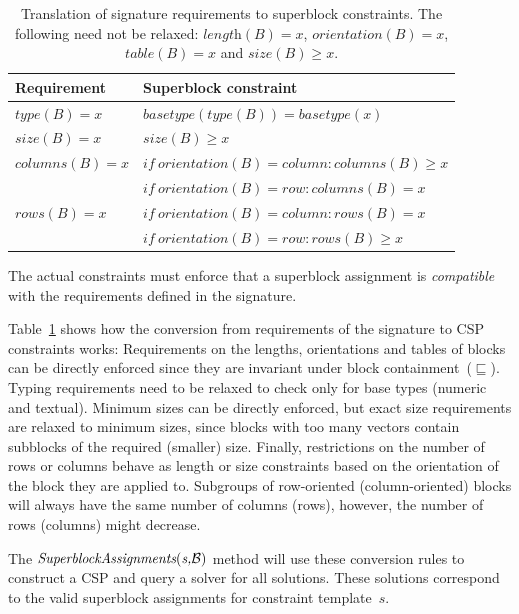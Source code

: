 \documentclass{IEEEtran}
\newcommand{\format}[1]{\textit{#1}\xspace}
\newcommand{\generategroups}{\format{SuperblockAssignments}}
\newcommand{\blocks}{\ensuremath{\mathcal{B}}\xspace}
\newcommand{\plength}{\format{length}}
\newcommand{\psize}{\format{size}}
\newcommand{\ptype}{\format{type}}
\newcommand{\ptable}{\format{table}}
\newcommand{\por}{\format{orientation}}
\newcommand{\prows}{\format{rows}}
\newcommand{\pcols}{\format{columns}}
\theoremstyle{definition}
\begin{document}
\begin{table}[t]
  \caption{Translation of signature requirements to superblock constraints. The following need not be relaxed: $\plength(B) = x$, $\por(B) = x$, $\ptable(B) = x$ and $\psize(B) \geq x$.}
  \label{tbl:translation}
  \begin{tabularx}{\linewidth}{lX}
    \textbf{Requirement} & \textbf{Superblock constraint} \\ \hline \hline
    $\ptype(B) = x$ & $\mathit{basetype}(\ptype(B)) = \mathit{basetype}(x)$ \\ \hline
    $\psize(B) = x$ & $\psize(B) \geq x$ \\ \hline
    $\pcols(B) = x$ & $\mathit{if}~\por(B) = \mathit{column}: \pcols(B) \geq x$ \\ 
    & $\mathit{if}~\por(B) = \mathit{row}: \pcols(B) = x$ \\ \hline
    $\prows(B) = x$ & $\mathit{if}~\por(B) = \mathit{column}: \prows(B) = x$ \\ 
    & $\mathit{if}~\por(B) = \mathit{row}: \prows(B) \geq x$
  \end{tabularx}
\end{table}

The actual constraints must enforce that a superblock assignment is \textit{compatible} with the requirements defined in the signature.

Table~\ref{tbl:translation} shows how the conversion from requirements of the signature to CSP constraints works:
Requirements on the lengths, orientations and tables of blocks can be directly enforced since they are invariant under block containment~($\sqsubseteq$).
Typing requirements need to be relaxed to check only for base types (numeric and textual).
Minimum sizes can be directly enforced, but exact size requirements are relaxed to minimum sizes, since blocks with too many vectors contain subblocks of the required (smaller) size.
Finally, restrictions on the number of rows or columns behave as length or size constraints based on the orientation of the block they are applied to.
Subgroups of row-oriented (column-oriented) blocks will always have the same number of columns (rows), however, the number of rows (columns) might decrease.

The $\generategroups(\textit{s,\blocks})$ method will use these conversion rules to construct a CSP and query a solver for all solutions.
These solutions correspond to the valid superblock assignments for constraint template~$s$.
\end{document}
